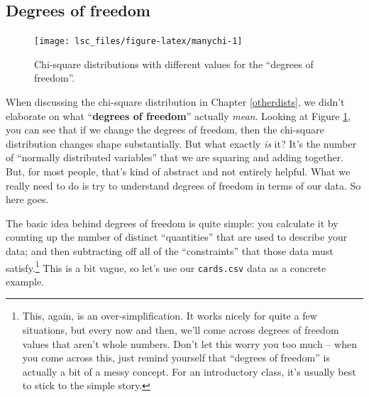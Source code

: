 \documentclass[
]{book}
\theoremstyle{definition}
\theoremstyle{definition}
\theoremstyle{definition}
\theoremstyle{definition}
\theoremstyle{remark}
\begin{document}
\hypertarget{degrees-of-freedom}{%
\subsection{Degrees of freedom}\label{degrees-of-freedom}}



\begin{figure}

{\centering \texttt{[image: lsc\_files/figure-latex/manychi-1]} 

}

\caption{Chi-square distributions with different values for the ``degrees of freedom''.}\label{fig:manychi}
\end{figure}

When discussing the chi-square distribution in Chapter \ref{otherdists}, we didn't elaborate on what ``\textbf{degrees of freedom}'' actually \emph{mean}. Looking at Figure \ref{fig:manychi}, you can see that if we change the degrees of freedom, then the chi-square distribution changes shape substantially. But what exactly \emph{is} it? It's the number of ``normally distributed variables'' that we are squaring and adding together. But, for most people, that's kind of abstract and not entirely helpful. What we really need to do is try to understand degrees of freedom in terms of our data. So here goes.

The basic idea behind degrees of freedom is quite simple: you calculate it by counting up the number of distinct ``quantities'' that are used to describe your data; and then subtracting off all of the ``constraints'' that those data must satisfy.\footnote{This, again, is an over-simplification. It works nicely for quite a few situations, but every now and then, we'll come across degrees of freedom values that aren't whole numbers. Don't let this worry you too much -- when you come across this, just remind yourself that ``degrees of freedom'' is actually a bit of a messy concept. For an introductory class, it's usually best to stick to the simple story.} This is a bit vague, so let's use our \texttt{cards.csv} data as a concrete example.
\end{document}
